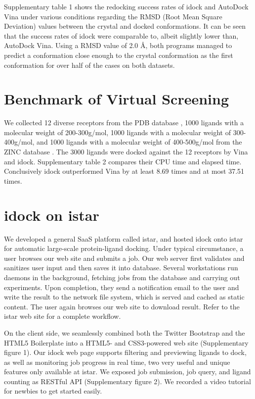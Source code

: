 \documentclass{bioinfo}
\begin{document}
Supplementary table 1 shows the redocking success rates of idock and AutoDock Vina under various conditions regarding the RMSD (Root Mean Square Deviation) values between the crystal and docked conformations. It can be seen that the success rates of idock were comparable to, albeit slightly lower than, AutoDock Vina. Using a RMSD value of 2.0 \AA, both programs managed to predict a conformation close enough to the crystal conformation as the first conformation for over half of the cases on both datasets.

\section{Benchmark of Virtual Screening}

We collected 12 diverse receptors from the PDB database \citep{540}, 1000 ligands with a molecular weight of 200-300g/mol, 1000 ligands with a molecular weight of 300-400g/mol, and 1000 ligands with a molecular weight of 400-500g/mol from the ZINC database \citep{1178}. The 3000 ligands were docked against the 12 receptors by Vina and idock. Supplementary table 2 compares their CPU time and elapsed time. Conclusively idock outperformed Vina by at least 8.69 times and at most 37.51 times.

\section{idock on istar}

We developed a general SaaS platform called istar, and hosted idock onto istar for automatic large-scale protein-ligand docking. Under typical circumstance, a user browses our web site and submits a job. Our web server first validates and sanitizes user input and then saves it into database. Several workstations run daemons in the background, fetching jobs from the database and carrying out experiments. Upon completion, they send a notification email to the user and write the result to the network file system, which is served and cached as static content. The user again browses our web site to download result. Refer to the istar web site for a complete workflow.

On the client side, we seamlessly combined both the Twitter Bootstrap and the HTML5 Boilerplate into a HTML5- and CSS3-powered web site (Supplementary figure 1). Our idock web page supports filtering and previewing ligands to dock, as well as monitoring job progress in real time, two very useful and unique features only available at istar. We exposed job submission, job query, and ligand counting as RESTful API (Supplementary figure 2). We recorded a video tutorial for newbies to get started easily.
\end{document}
